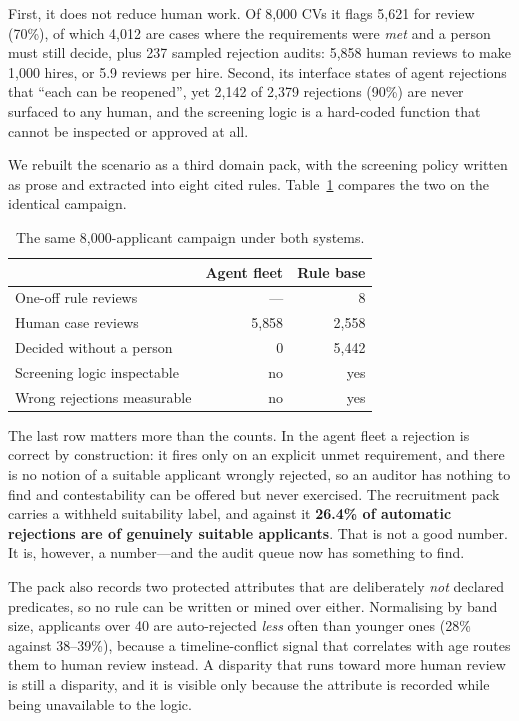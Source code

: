 \documentclass[sigconf,nonacm]{acmart}
\begin{document}
First, it does not reduce human work. Of 8{,}000 CVs it flags 5{,}621 for review
(70\%), of which 4{,}012 are cases where the requirements were \emph{met} and a
person must still decide, plus 237 sampled rejection audits: 5{,}858 human
reviews to make 1{,}000 hires, or 5.9 reviews per hire. Second, its interface
states of agent rejections that ``each can be reopened'', yet 2{,}142 of 2{,}379
rejections (90\%) are never surfaced to any human, and the screening logic is a
hard-coded function that cannot be inspected or approved at all.

We rebuilt the scenario as a third domain pack, with the screening policy written
as prose and extracted into eight cited rules. Table~\ref{tab:recruitment}
compares the two on the identical campaign.

\begin{table}[t]
  \caption{The same 8{,}000-applicant campaign under both systems.}
  \label{tab:recruitment}
  \begin{tabular}{lrr}
    \toprule
    & \textbf{Agent fleet} & \textbf{Rule base} \\
    \midrule
    One-off rule reviews        & ---     & 8 \\
    Human case reviews          & 5{,}858 & 2{,}558 \\
    Decided without a person    & 0       & 5{,}442 \\
    Screening logic inspectable & no      & yes \\
    Wrong rejections measurable & no      & yes \\
    \bottomrule
  \end{tabular}
\end{table}

The last row matters more than the counts. In the agent fleet a rejection is
correct by construction: it fires only on an explicit unmet requirement, and
there is no notion of a suitable applicant wrongly rejected, so an auditor has
nothing to find and contestability can be offered but never exercised. The
recruitment pack carries a withheld suitability label, and against it
\textbf{26.4\% of automatic rejections are of genuinely suitable applicants}.
That is not a good number. It is, however, a number---and the audit queue now
has something to find.

The pack also records two protected attributes that are deliberately \emph{not}
declared predicates, so no rule can be written or mined over either. Normalising
by band size, applicants over 40 are auto-rejected \emph{less} often than
younger ones (28\% against 38--39\%), because a timeline-conflict signal that
correlates with age routes them to human review instead. A disparity that runs
toward more human review is still a disparity, and it is visible only because
the attribute is recorded while being unavailable to the logic.
\end{document}
